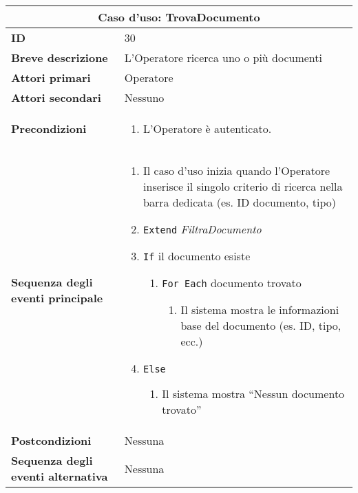 \documentclass[a4paper]{report}
\begin{document}
\clearpage
\begin{table}[H]
\vspace*{-0cm}
\renewcommand{\arraystretch}{1.9}
\begin{tabular}{|p{3.9cm}|p{9.9cm}|}
\hline
\multicolumn{2}{|c|}{\textbf{Caso d’uso: TrovaDocumento}} \\ \hline
	\textbf{ID} & 30 \\ \hline
	\textbf{Breve descrizione} & L’Operatore ricerca uno o più documenti \\ \hline
	\textbf{Attori primari} & Operatore \\ \hline
	\textbf{Attori secondari} & Nessuno \\ \hline
	\textbf{Precondizioni} & \begin{enumerate}[leftmargin=14pt,label=\arabic*.,labelsep=0.5em,topsep=0pt,partopsep=0pt,parsep=0pt,itemsep=0pt]
        \item L’Operatore è autenticato.
    \end{enumerate} \\ \hline
	\textbf{Sequenza degli eventi principale} & 
\begin{enumerate}[leftmargin=14pt,label=\arabic*.,labelsep=0.5em,topsep=0pt,partopsep=0pt,parsep=0pt,itemsep=0pt]
    \item Il caso d’uso inizia quando l’Operatore inserisce il singolo criterio di ricerca nella barra dedicata (es. ID documento, tipo)
    \item \texttt{Extend} \textit{FiltraDocumento}
    \item \texttt{If} il documento esiste
    \begin{enumerate}[label=\arabic{enumi}.\arabic*.,leftmargin=22pt,labelsep=0.5em,topsep=0pt,partopsep=0pt,parsep=0pt,itemsep=0pt]
        \item \texttt{For Each} documento trovato
        \begin{enumerate}[label=\arabic{enumi}.\arabic{enumii}.\arabic*.,leftmargin=22pt,labelsep=0.5em,topsep=0pt,partopsep=0pt,parsep=0pt,itemsep=0pt]
            \item Il sistema mostra le informazioni base del documento (es. ID, tipo, ecc.)
        \end{enumerate}
    \end{enumerate}
    \item \texttt{Else}
    \begin{enumerate}[label=\arabic{enumi}.\arabic*.,leftmargin=22pt,labelsep=0.5em,topsep=0pt,partopsep=0pt,parsep=0pt,itemsep=0pt]
        \item Il sistema mostra “Nessun documento trovato”
    \end{enumerate}
\end{enumerate}\\ \hline
	\textbf{Postcondizioni} & Nessuna \\ \hline
	\textbf{Sequenza degli eventi alternativa} & Nessuna \\ \hline
\end{tabular}
\end{table}
\end{document}
